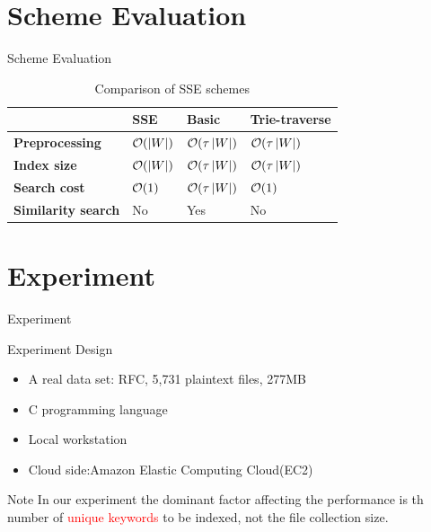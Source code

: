 \documentclass{beamer}
\begin{document}
\section{Scheme Evaluation}

\begin{frame}{Scheme Evaluation}
	\begin{table}
		\begin{tabular}{l l l l}
			\toprule
			{} & \textbf{SSE} & \textbf{Basic} & \textbf{Trie-traverse}\\
			\midrule
			 \textbf{Preprocessing} & ${\cal O}(\left| W \right|)$ & ${\cal O}(\tau \left| W \right|)$ & ${\cal O}(\tau \left| W \right|)$ \\
			 \textbf{Index size} & ${\cal O}(\left| W \right|)$ & ${\cal O}(\tau \left| W \right|)$ & ${\cal O}(\tau \left| W \right|)$ \\
			 \textbf{Search cost} & ${\cal O}(1)$ & ${\cal O}(\tau \left| W \right|)$ & \textcolor{red}{${\cal O}(1)$}  \\
			 \textbf{Similarity search} & No & Yes & No \\
			\bottomrule
		\end{tabular}
		\caption{Comparison of SSE schemes}
	\end{table}

\end{frame}

\section{Experiment}

\begin{frame}{Experiment}
		\begin{block}{Experiment Design}
			\begin{itemize}
				\item A real data set: RFC, 5,731 plaintext files, 277MB
				\item C programming language 
				\item Local workstation
				\item Cloud side:Amazon Elastic Computing Cloud(EC2)
			\end{itemize}
		\end{block}
		\begin{exampleblock}{Note}
			In our experiment the dominant factor affecting the performance is th number of \textcolor{red}{unique keywords} to be indexed, not the \textcolor[rgb]{0.1,0.7,0.2}{file collection size}.
		\end{exampleblock}
\end{frame}
\end{document}
